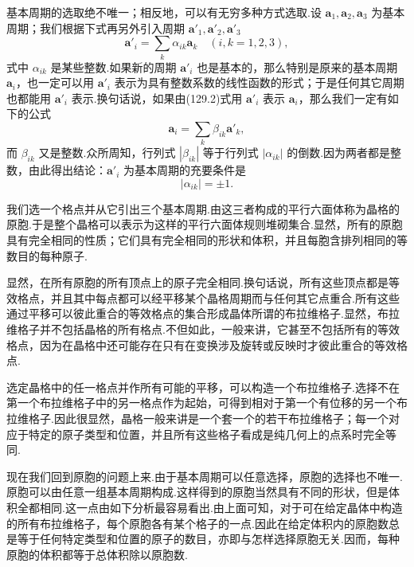 基本周期的选取绝不唯一；相反地，可以有无穷多种方式选取.设 $\boldsymbol{a}_1,\boldsymbol{a}_2,\boldsymbol{a}_3$ 为基本周期；我们根据下式再另外引入周期 $\boldsymbol{a}'_1,\boldsymbol{a}'_2,\boldsymbol{a}'_3$
\begin{equation}
  \boldsymbol{a}'_i=\sum_k\alpha_{ik}\boldsymbol{a}_k\quad(i,k=1,2,3),
\end{equation}
式中 $\alpha_{ik}$ 是某些整数.如果新的周期 $\boldsymbol{a}'_i$ 也是基本的，那么特别是原来的基本周期 $\boldsymbol{a}_i$，也一定可以用 $\boldsymbol{a}'_i$ 表示为具有整数系数的线性函数的形式；于是任何其它周期也都能用 $\boldsymbol{a}'_i$ 表示.换句话说，如果由(129.2)式用 $\boldsymbol{a}'_i$ 表示 $\boldsymbol{a}_i$，那么我们一定有如下的公式
\begin{equation*}
  \boldsymbol{a}_i=\sum_k\beta_{ik}\boldsymbol{a}'_k,
\end{equation*}
而 $\beta_{ik}$ 又是整数.众所周知，行列式 $|\beta_{ik}|$ 等于行列式 $|\alpha_{ik}|$ 的倒数.因为两者都是整数，由此得出结论：$\boldsymbol{a}'_i$ 为基本周期的充要条件是
\begin{equation}
  |\alpha_{ik}|=\pm1.
\end{equation}

我们选一个格点并从它引出三个基本周期.由这三者构成的平行六面体称为晶格的原胞.于是整个晶格可以表示为这样的平行六面体规则堆砌集合.显然，所有的原胞具有完全相同的性质；它们具有完全相同的形状和体积，并且每胞含排列相同的等数目的每种原子.

显然，在所有原胞的所有顶点上的原子完全相同.换句话说，所有这些顶点都是等效格点，并且其中每点都可以经平移某个晶格周期而与任何其它点重合.所有这些通过平移可以彼此重合的等效格点的集合形成晶体所谓的布拉维格子.显然，布拉维格子并不包括晶格的所有格点.不但如此，一般来讲，它甚至不包括所有的等效格点，因为在晶格中还可能存在只有在变换涉及旋转或反映时才彼此重合的等效格点.

选定晶格中的任一格点并作所有可能的平移，可以构造一个布拉维格子.选择不在第一个布拉维格子中的另一格点作为起始，可得到相对于第一个有位移的另一个布拉维格子.因此很显然，晶格一般来讲是一个套一个的若干布拉维格子；每一个对应于特定的原子类型和位置，并且所有这些格子看成是纯几何上的点系时完全等同.

现在我们回到原胞的问题上来.由于基本周期可以任意选择，原胞的选择也不唯一.原胞可以由任意一组基本周期构成.这样得到的原胞当然具有不同的形状，但是体积全都相同.这一点由如下分析最容易看出.由上面可知，对于可在给定晶体中构造的所有布拉维格子，每个原胞各有某个格子的一点.因此在给定体积内的原胞数总是等于任何特定类型和位置的原子的数目，亦即与怎样选择原胞无关.因而，每种原胞的体积都等于总体积除以原胞数.

